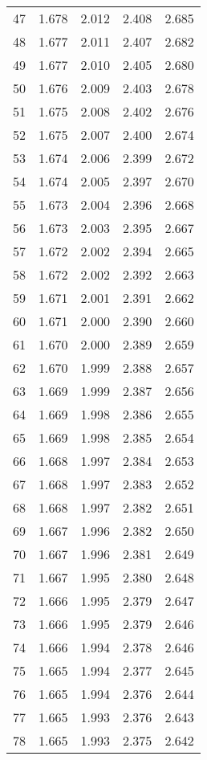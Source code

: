 {\begin{minipage}[t]{0.485\linewidth}
\begin{tabular}{r|cccc}
47  & 1.678  & 2.012  & 2.408  & 2.685 \\
48  & 1.677  & 2.011  & 2.407  & 2.682 \\
49  & 1.677  & 2.010  & 2.405  & 2.680 \\
50  & 1.676  & 2.009  & 2.403  & 2.678 \\
51  & 1.675  & 2.008  & 2.402  & 2.676 \\
52  & 1.675  & 2.007  & 2.400  & 2.674 \\
53  & 1.674  & 2.006  & 2.399  & 2.672 \\
54  & 1.674  & 2.005  & 2.397  & 2.670 \\
55  & 1.673  & 2.004  & 2.396  & 2.668 \\
56  & 1.673  & 2.003  & 2.395  & 2.667 \\
57  & 1.672  & 2.002  & 2.394  & 2.665 \\
58  & 1.672  & 2.002  & 2.392  & 2.663 \\
59  & 1.671  & 2.001  & 2.391  & 2.662 \\
60  & 1.671  & 2.000  & 2.390  & 2.660 \\
61  & 1.670  & 2.000  & 2.389  & 2.659 \\
62  & 1.670  & 1.999  & 2.388  & 2.657 \\
63  & 1.669  & 1.999  & 2.387  & 2.656 \\
64  & 1.669  & 1.998  & 2.386  & 2.655 \\
65  & 1.669  & 1.998  & 2.385  & 2.654 \\
66  & 1.668  & 1.997  & 2.384  & 2.653 \\
67  & 1.668  & 1.997  & 2.383  & 2.652 \\
68  & 1.668  & 1.997  & 2.382  & 2.651 \\
69  & 1.667  & 1.996  & 2.382  & 2.650 \\
70  & 1.667  & 1.996  & 2.381  & 2.649 \\
71  & 1.667  & 1.995  & 2.380  & 2.648 \\
72  & 1.666  & 1.995  & 2.379  & 2.647 \\
73  & 1.666  & 1.995  & 2.379  & 2.646 \\
74  & 1.666  & 1.994  & 2.378  & 2.646 \\
75  & 1.665  & 1.994  & 2.377  & 2.645 \\
76  & 1.665  & 1.994  & 2.376  & 2.644 \\
77  & 1.665  & 1.993  & 2.376  & 2.643 \\
78  & 1.665  & 1.993  & 2.375  & 2.642 \\

\end{tabular}
\end{minipage}}

